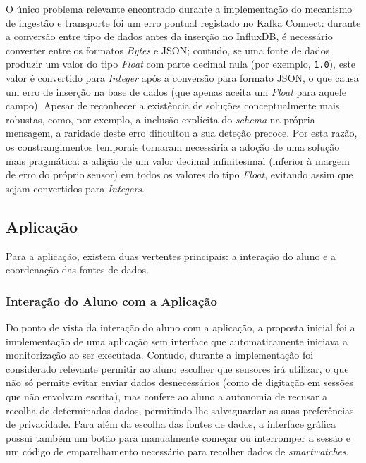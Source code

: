 O único problema relevante encontrado durante a implementação do mecanismo de ingestão e transporte foi um erro pontual registado no Kafka Connect: durante a conversão entre tipo de dados antes da inserção no InfluxDB, é necessário converter entre os formatos \textit{Bytes} e \ac{JSON}; contudo, se uma fonte de dados produzir um valor do tipo \textit{Float} com parte decimal nula (por exemplo, \texttt{1.0}), este valor é convertido para \textit{Integer} após a conversão para formato \ac{JSON}, o que causa um erro de inserção na base de dados (que apenas aceita um \textit{Float} para aquele campo).
Apesar de reconhecer a existência de soluções conceptualmente mais robustas, como, por exemplo, a inclusão explícita do \textit{schema} na própria mensagem, a raridade deste erro dificultou a sua deteção precoce.
Por esta razão, os constrangimentos temporais tornaram necessária a adoção de uma solução mais pragmática: a adição de um valor decimal infinitesimal (inferior à margem de erro do próprio sensor) em todos os valores do tipo \textit{Float}, evitando assim que sejam convertidos para \textit{Integers}.

\subsection{Aplicação}

Para a aplicação, existem duas vertentes principais: a interação do aluno e a coordenação das fontes de dados.

\subsubsection{Interação do Aluno com a Aplicação}

Do ponto de vista da interação do aluno com a aplicação, a proposta inicial foi a implementação de uma aplicação sem interface que automaticamente iniciava a monitorização ao ser executada.
Contudo, durante a implementação foi considerado relevante permitir ao aluno escolher que sensores irá utilizar, o que não só permite evitar enviar dados desnecessários (como de digitação em sessões que não envolvam escrita), mas confere ao aluno a autonomia de recusar a recolha de determinados dados, permitindo-lhe salvaguardar as suas preferências de privacidade.
Para além da escolha das fontes de dados, a interface gráfica possui também um botão para manualmente começar ou interromper a sessão e um código de emparelhamento necessário para recolher dados de \textit{smartwatches}.

